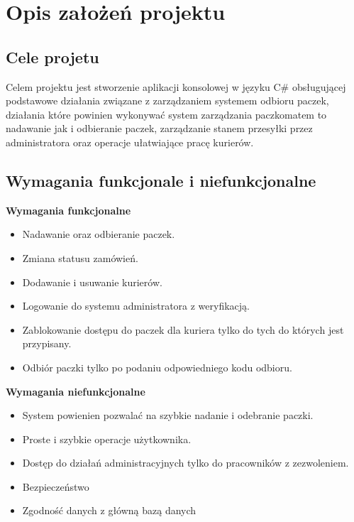 \chapter{Opis założeń projektu}
\section{Cele projetu}

Celem projektu jest stworzenie aplikacji konsolowej w języku C\# obsługującej podstawowe działania związane z zarządzaniem systemem odbioru paczek, działania które powinien wykonywać system zarządzania paczkomatem to nadawanie jak i odbieranie paczek, zarządzanie stanem przesyłki przez administratora oraz operacje ułatwiające pracę kurierów.

\section{Wymagania funkcjonale i niefunkcjonalne}


\noindent \textbf{Wymagania funkcjonalne}
\begin{itemize}
    \item Nadawanie oraz odbieranie paczek.
    \item Zmiana statusu zamówień.
    \item Dodawanie i usuwanie kurierów.
    \item Logowanie do systemu administratora z weryfikacją.
    \item Zablokowanie dostępu do paczek dla kuriera tylko do tych do których jest przypisany.
    \item Odbiór paczki tylko po podaniu odpowiedniego kodu odbioru.

\end{itemize}

\noindent \textbf{Wymagania niefunkcjonalne }
\begin{itemize}
    \item System powienien pozwalać na szybkie nadanie i odebranie paczki.    
    \item Proste i szybkie operacje użytkownika.
    \item Dostęp do działań administracyjnych tylko do pracowników z zezwoleniem.
    \item Bezpieczeństwo
    \item Zgodność danych z główną bazą danych
\end{itemize}
